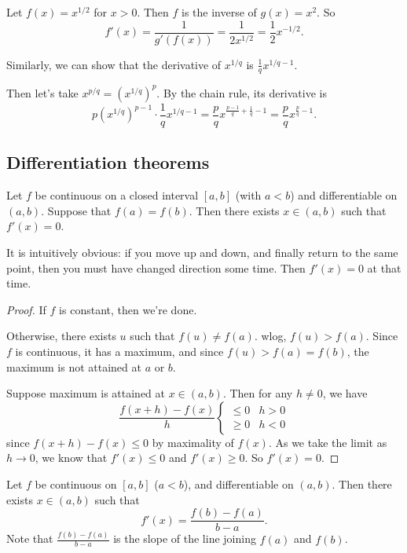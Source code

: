 \documentclass[a4paper]{article}
\begin{document}
\begin{eg}
  Let $f(x) = x^{1/2}$ for $x > 0$. Then $f$ is the inverse of $g(x) = x^2$. So
  \[
    f'(x) = \frac{1}{g'(f(x))} = \frac{1}{2x^{1/2}} = \frac{1}{2}x^{-1/2}.
  \]

  Similarly, we can show that the derivative of $x^{1/q}$ is $\frac{1}{q}x^{1/q - 1}$.

  Then let's take $x^{p/q} = (x^{1/q})^p$. By the chain rule, its derivative is
  \[
    p(x^{1/q})^{p - 1}\cdot \frac{1}{q}x^{1/q - 1} = \frac{p}{q}x^{\frac{p - 1}{q} + \frac{1}{q} - 1} = \frac{p}{q}x^{\frac{p}{q} - 1}.
  \]
\end{eg}

\subsection{Differentiation theorems}
\begin{thm}
  Let $f$ be continuous on a closed interval $[a, b]$ (with $a < b$) and differentiable on $(a, b)$. Suppose that $f(a) = f(b)$. Then there exists $x\in (a, b)$ such that $f'(x) = 0 $.
\end{thm}
It is intuitively obvious: if you move up and down, and finally return to the same point, then you must have changed direction some time. Then $f'(x) = 0$ at that time.

\begin{proof}
  If $f$ is constant, then we're done.

  Otherwise, there exists $u$ such that $f(u) \not= f(a)$. wlog, $f(u) > f(a)$. Since $f$ is continuous, it has a maximum, and since $f(u) > f(a) = f(b)$, the maximum is not attained at $a$ or $b$.

  Suppose maximum is attained at $x\in (a, b)$. Then for any $h \not = 0$, we have
  \[
    \frac{f(x + h) - f(x)}{h}
    \begin{cases}
      \leq 0 & h > 0\\
      \geq 0 & h < 0
    \end{cases}
  \]
  since $f(x + h) - f(x) \leq 0$ by maximality of $f(x)$. As we take the limit as $h\to 0$, we know that $f'(x) \leq 0$ and $f'(x) \geq 0$. So $f'(x) = 0$.
\end{proof}

\begin{cor}
  Let $f$ be continuous on $[a, b]$ ($a < b$), and differentiable on $(a, b)$. Then there exists $x\in (a, b)$ such that
  \[
    f'(x) = \frac{f(b) - f(a)}{b - a}.
  \]
  Note that $\frac{f(b) - f(a)}{b - a}$ is the slope of the line joining $f(a)$ and $f(b)$.
  \begin{center}
  \end{center}
\end{cor}
\end{document}
